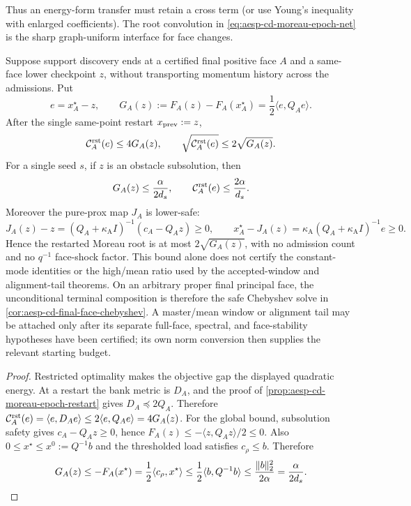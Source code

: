 Thus an energy-form transfer must retain a cross term (or use Young's
inequality with enlarged coefficients).  The root convolution in
\cref{eq:aesp-cd-moreau-epoch-net} is the sharp graph-uniform interface for
face changes.

\begin{corollary}
\label{cor:aesp-cd-discover-then-restart}
Suppose support discovery ends at a certified final positive face $A$ and a
same-face lower checkpoint $z$, without transporting momentum history across
the admissions.  Put
\begin{equation*}
 e=x_A^\star-z,\qquad
 G_A(z):=F_A(z)-F_A(x_A^\star)
       =\frac12\langle e,Q_Ae\rangle.
\end{equation*}
After the single same-point restart $x_{\rm prev}:=z$,
\begin{equation}
 \mathcal C_A^{\rm rst}(e)\leq4G_A(z),
 \qquad
 \sqrt{\mathcal C_A^{\rm rst}(e)}\leq2\sqrt{G_A(z)}.
 \label{eq:aesp-cd-discover-then-restart}
\end{equation}
For a single seed $s$, if $z$ is an obstacle subsolution, then
\begin{equation}
 G_A(z)\leq\frac{\alpha}{2d_s},
 \qquad
 \mathcal C_A^{\rm rst}(e)\leq\frac{2\alpha}{d_s}.
 \label{eq:aesp-cd-discover-then-restart-global}
\end{equation}
Moreover the pure-prox map $J_A$ is lower-safe:
\begin{equation*}
 J_A(z)-z=(Q_A+\kappa_{\mathrm A}I)^{-1}(c_A-Q_Az)\geq0,
 \qquad
 x_A^\star-J_A(z)
 =\kappa_{\mathrm A}(Q_A+\kappa_{\mathrm A}I)^{-1}e\geq0.
\end{equation*}
Hence the restarted Moreau root is at most $2\sqrt{G_A(z)}$, with no
admission count and no $q^{-1}$ face-shock factor.  This bound alone does not
certify the constant-mode identities or the high/mean ratio used by the
accepted-window and alignment-tail theorems.  On an arbitrary proper final
principal face, the unconditional terminal composition is therefore the safe
Chebyshev solve in \cref{cor:aesp-cd-final-face-chebyshev}.  A master/mean
window or alignment tail may be attached only after its separate full-face,
spectral, and face-stability hypotheses have been certified; its own norm
conversion then supplies the relevant starting budget.
\end{corollary}

\begin{proof}
Restricted optimality makes the objective gap the displayed quadratic
energy.  At a restart the bank metric is $D_A$, and the proof of
\cref{prop:aesp-cd-moreau-epoch-restart} gives $D_A\preceq2Q_A$.
Therefore
$\mathcal C_A^{\rm rst}(e)=\langle e,D_Ae\rangle
\leq2\langle e,Q_Ae\rangle=4G_A(z)$.
For the global bound, subsolution safety gives
$c_A-Q_Az\geq0$, hence $F_A(z)\leq-\langle z,Q_Az\rangle/2\leq0$.
Also $0\leq x^\star\leq x^0:=Q^{-1}b$ and the thresholded load satisfies
$c_\rho\leq b$.  Therefore
\begin{equation*}
 G_A(z)\leq-F_A(x^\star)
 =\frac12\langle c_\rho,x^\star\rangle
 \leq\frac12\langle b,Q^{-1}b\rangle
 \leq\frac{\lVert b\rVert_2^2}{2\alpha}
 =\frac{\alpha}{2d_s}.
\end{equation*}
\end{proof}


